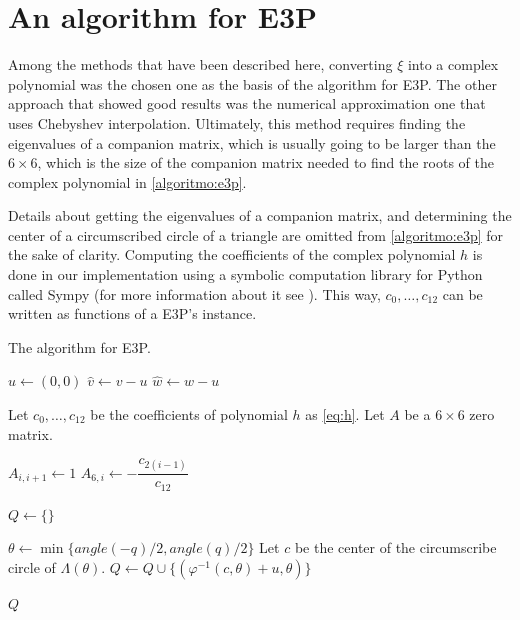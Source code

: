 \section{An algorithm for E3P}

Among the methods that have been described here, converting $\xi$ into a complex polynomial was the chosen one as the basis of the algorithm for E3P.
The other approach that showed good results was the numerical approximation one that uses Chebyshev interpolation. Ultimately, this method requires finding the eigenvalues of a companion matrix, which is usually going to be larger than the $6\times 6$, which is the size of the companion matrix needed to find the roots of the complex polynomial in \autoref{algoritmo:e3p}. 

Details about getting the eigenvalues of a companion matrix, and determining the center of a circumscribed circle of a triangle are omitted from \autoref{algoritmo:e3p} for the sake of clarity. 
Computing the coefficients of the complex polynomial $h$ is done in our implementation using a symbolic computation library for Python called Sympy (for more information about it see ). This way, $c_0, \dots, c_{12}$ can be written as functions of a E3P's instance.


\begin{algoritmo}
	\caption{The algorithm for E3P.}\label{algoritmo:e3p}
	\begin{algorithmic}[1]
		
		\item[]
		
		
		\State $\hat{u}\gets (0,0)$ 
		\State $\hat{v} \gets v-u$
		\State $\hat{w} \gets w-u$
		
		\State Let $c_0, \dots, c_{12}$ be the coefficients of polynomial $h$ as \autoref{eq:h}.
		\State Let $A$ be a $6\times6$ zero matrix.
		
			\State $A_{i,i+1} \gets 1$
			\State $A_{6,i} \gets -\dfrac{c_{2(i-1)}}{c_{12}}$
		\EndFor

		
		\State $Q \gets \{\}$
		
		 
		\State $\theta\gets \min\{angle(-q)/2, angle(q)/2\}$
			\State Let $c$ be the center of the circumscribe circle of $\Lambda(\theta)$.
			\State $Q \gets Q\cup \{(\varphi^{-1}(c, \theta)+u, \theta)\}$
		\EndIf
		\EndFor
				
		\State \Return $Q$
		\EndProcedure
	\end{algorithmic}
\end{algoritmo}

